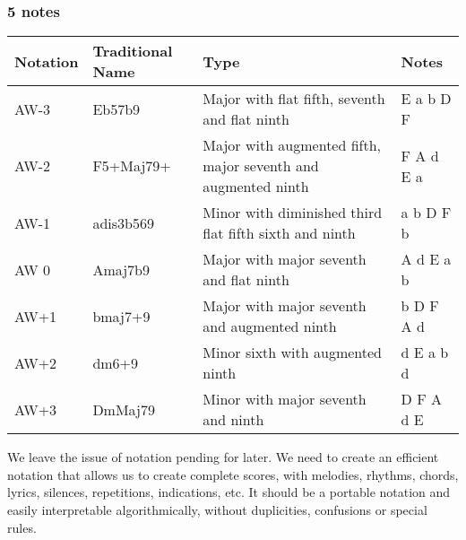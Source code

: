\documentclass[]{report}
\begin{document}
\subsubsection*{5 notes}
\begin{table}[H]
\centering
\begin{tabularx}{\textwidth}{ll>{\raggedright\arraybackslash}Xl}
\toprule
Notation & Traditional Name & Type & Notes \\
\midrule
\textsf{AW-3} & Eb57b9 & Major with flat fifth, seventh and flat ninth & E a b D F \\
\textsf{AW-2} & F5+Maj79+ & Major with augmented fifth, major seventh and augmented ninth & F A d E a \\
\textsf{AW-1} & adis3b569 & Minor with diminished third flat fifth sixth and ninth & a b D F b \\
\textsf{AW 0} & Amaj7b9 & Major with major seventh and flat ninth & A d E a b \\
\textsf{AW+1} & bmaj7+9 & Major with major seventh and augmented ninth & b D F A d \\
\textsf{AW+2} & dm6+9 & Minor sixth with augmented ninth & d E a b d \\
\textsf{AW+3} & DmMaj79 & Minor with major seventh and ninth & D F A d E \\
\bottomrule
\end{tabularx}
\end{table}
We leave the issue of notation pending for later. We need to create an efficient notation that allows us to create complete scores, with melodies, rhythms, chords, lyrics, silences, repetitions, indications, etc.
It should be a portable notation and easily interpretable algorithmically, without duplicities, confusions or special rules.
\end{document}
